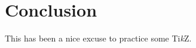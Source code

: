 \section{Conclusion}
\label{sec:conclusion}

This has been a nice excuse to practice some Ti\textit{k}Z.
